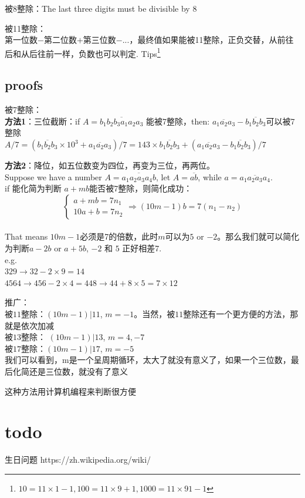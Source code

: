 \documentclass[../main.tex]{subfiles}
\begin{document}
被8整除：The last three digits must be divisible by 8

被11整除：\\
第一位数$-$第二位数$+$第三位数$-$...，最终值如果能被11整除，正负交替，从前往后和从后往前一样，负数也可以判定. Tips\footnote{$10=11\times 1 - 1, 100=11\times 9 + 1, 1000=11\times 91-1$}

\subsection{proofs} \label{sec:proof}
被7整除：\\
\textbf{方法1}：三位截断：if $A=\overline{b_1b_2b_3a_1a_2a_3}$ 能被7整除，then: $\overline{a_1a_2a_3} - \overline{b_1b_2b_3}$可以被7整除\\
$A/7 = (\overline{b_1b_2b_3}\times 10^3 + \overline{a_1a_2a_3})/7
= 143\times \overline{b_1b_2b_3} + (\overline{a_1a_2a_3} - \overline{b_1b_2b_3})/7
$

\textbf{方法2}：降位，如五位数变为四位，再变为三位，再两位。\\
Suppose we have a number $A=\overline{a_1a_2a_3a_4b}$, let $A=\overline{ab}$, while $a=\overline{a_1a_2a_3a_4}$.\\
if 能化简为判断 $a+mb$能否被7整除，则简化成功：\\
\[
\begin{cases}
  a + mb = 7n_1\\
  10a + b = 7n_2
\end{cases}
\Rightarrow
(10m-1)b = 7(n_1-n_2)
\]
\\
That means $10m-1$必须是7的倍数，此时$m$可以为$5$ or $-2$。那么我们就可以简化为判断$a-2b$ or $a+5b$, $-2$ 和 $5$ 正好相差7.\\
e.g.\\
$329 \to 32-2\times 9=14 $ \\
$4564 \to 456-2\times 4=448 \to 44+8\times 5=7\times 12$

推广：\\
被$11$整除：$(10m-1)|11$, $m=-1$。当然，被$11$整除还有一个更方便的方法，那就是依次加减\\
被$13$整除： $(10m-1)|13$, $m=4,-7$\\
被$17$整除：$(10m-1)|17$, $m=-5$\\
我们可以看到，m是一个呈周期循环，太大了就没有意义了，如果一个三位数，最后化简还是三位数，就没有了意义

这种方法用计算机编程来判断很方便

\newpage
\section{todo}
生日问题
https://zh.wikipedia.org/wiki/%

\newpage
\end{document}

